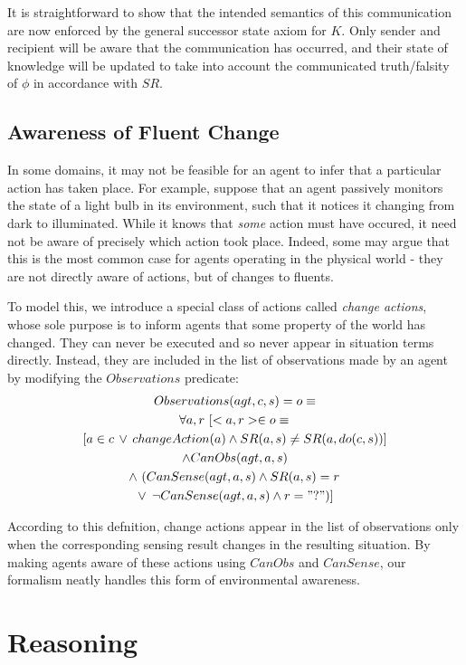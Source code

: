 \documentclass[letterpaper]{article}
\begin{document}
It is straightforward to show that the intended semantics of this
communication are now enforced by the general successor state axiom
for $K$. Only sender and recipient will be aware that the communication
has occurred, and their state of knowledge will be updated to take
into account the communicated truth/falsity of $\phi$ in accordance
with $SR$.


\subsection{Awareness of Fluent Change}

In some domains, it may not be feasible for an agent to infer that
a particular action has taken place. For example, suppose that an
agent passively monitors the state of a light bulb in its environment,
such that it notices it changing from dark to illuminated. While it
knows that \emph{some} action must have occured, it need not be aware
of precisely which action took place. Indeed, some may argue that
this is the most common case for agents operating in the physical
world - they are not directly aware of actions, but of changes to
fluents.

To model this, we introduce a special class of actions called \emph{change
actions}, whose sole purpose is to inform agents that some property
of the world has changed. They can never be executed and so never
appear in situation terms directly. Instead, they are included in
the list of observations made by an agent by modifying the $Observations$
predicate:
\begin{multline}
Observations(agt,c,s)=o\equiv\\
\forall a,r\,\left[<a,r>\in o\equiv\right.\\
\left[a\in c\,\vee\, changeAction(a)\wedge SR(a,s)\neq SR(a,do(c,s))\right]\\
\wedge CanObs(agt,a,s)\\
\wedge\,\left(CanSense(agt,a,s)\wedge SR(a,s)=r\right.\\
\left.\vee\,\left.\neg CanSense(agt,a,s)\wedge r="?"\right)\right]
\end{multline}


According to this defnition, change actions appear in the list of
observations only when the corresponding sensing result changes in
the resulting situation. By making agents aware of these actions using
$CanObs$ and $CanSense$, our formalism neatly handles this form
of environmental awareness.


\section{Reasoning}
\end{document}
